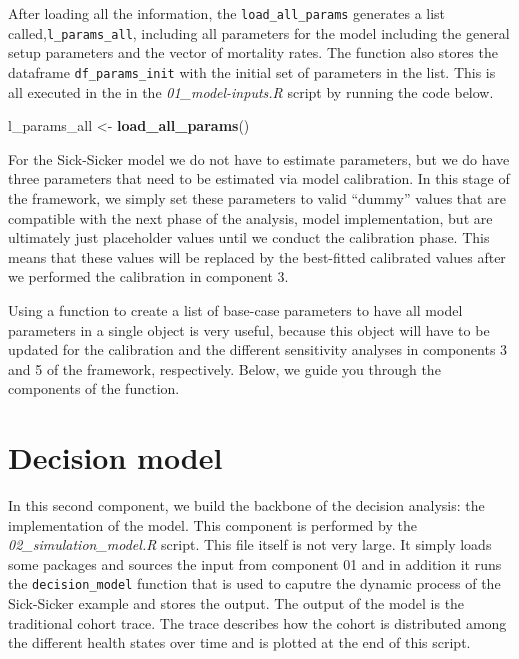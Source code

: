 \documentclass[]{book}
\newenvironment{Shaded}{\begin{snugshade}}{\end{snugshade}}
\newcommand{\KeywordTok}[1]{\textcolor[rgb]{0.13,0.29,0.53}{\textbf{#1}}}
\newcommand{\StringTok}[1]{\textcolor[rgb]{0.31,0.60,0.02}{#1}}
\newcommand{\NormalTok}[1]{#1}
\begin{document}
After loading all the information, the \texttt{load\_all\_params}
generates a list called,\texttt{l\_params\_all}, including all
parameters for the model including the general setup parameters and the
vector of mortality rates. The function also stores the dataframe
\texttt{df\_params\_init} with the initial set of parameters in the
list. This is all executed in the in the \emph{01\_model-inputs.R}
script by running the code below.

\begin{Shaded}
\begin{Highlighting}[]
\NormalTok{l_params_all <-}\StringTok{ }\KeywordTok{load_all_params}\NormalTok{()}
\end{Highlighting}
\end{Shaded}

For the Sick-Sicker model we do not have to estimate parameters, but we
do have three parameters that need to be estimated via model
calibration. In this stage of the framework, we simply set these
parameters to valid ``dummy'' values that are compatible with the next
phase of the analysis, model implementation, but are ultimately just
placeholder values until we conduct the calibration phase. This means
that these values will be replaced by the best-fitted calibrated values
after we performed the calibration in component 3.

Using a function to create a list of base-case parameters to have all
model parameters in a single object is very useful, because this object
will have to be updated for the calibration and the different
sensitivity analyses in components 3 and 5 of the framework,
respectively. Below, we guide you through the components of the
function.

\chapter{Decision model}\label{simulation}

In this second component, we build the backbone of the decision
analysis: the implementation of the model. This component is performed
by the \emph{02\_simulation\_model.R} script. This file itself is not
very large. It simply loads some packages and sources the input from
component 01 and in addition it runs the \texttt{decision\_model}
function that is used to caputre the dynamic process of the Sick-Sicker
example and stores the output. The output of the model is the
traditional cohort trace. The trace describes how the cohort is
distributed among the different health states over time and is plotted
at the end of this script.
\end{document}
